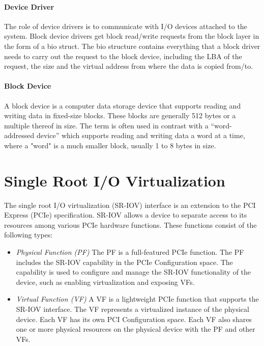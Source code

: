 \paragraph{Device Driver}
\label{iovirt:driver}
The role of device drivers is to communicate with I/O devices attached to the system.
Block device drivers get block read/write requests from the block layer in the form of a bio
struct.
The bio structure contains everything that a block driver needs to carry out the request to
the block device, including the LBA of the request, the size
and the virtual address from where the data is copied from/to.

\paragraph{Block Device}
A block device is a computer data storage device that supports reading and writing data in
fixed-size blocks. These blocks are generally 512 bytes or a multiple thereof in size. The term is often used in contrast with a ``word-addressed device'' which supports reading and
writing data a word at a time, where a "word" is a much smaller block, usually 1 to 8 bytes in size.

\section{Single Root I/O Virtualization}
The single root I/O virtualization (SR-IOV) interface is an extension to the PCI Express (PCIe) specification.
SR-IOV allows a device to separate access to its resources among various PCIe hardware functions. These functions consist of the following types:

\begin{itemize}
\item \emph{Physical Function (PF)} \quad
  The PF is a full-featured PCIe function. The PF includes the SR-IOV capability in the PCIe Configuration space.
  The capability is used to configure and manage the SR-IOV functionality of the device, such as enabling
  virtualization and exposing VFs.
\item \emph{Virtual Function (VF)} \quad
  A VF is a lightweight PCIe function that supports the SR-IOV interface. The VF represents a virtualized instance of the physical device.
  Each VF has its own PCI Configuration space. Each VF also shares one or more physical
  resources on the physical device with the PF and other VFs.
\end{itemize}

